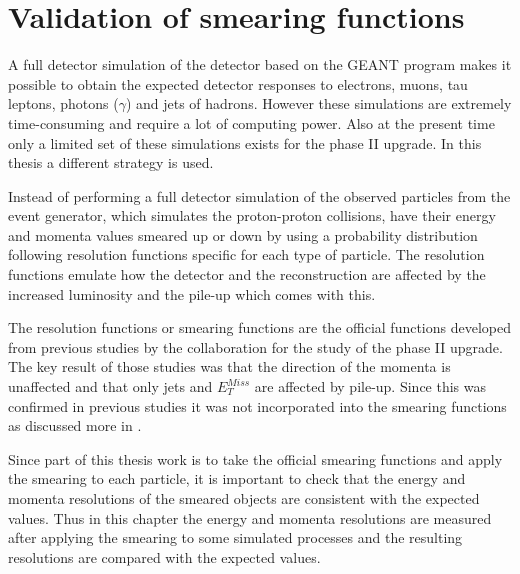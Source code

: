 \chapter{Validation of smearing functions}\label{cha:vali}
A full detector simulation of the \abbrATLAS detector based on the GEANT \citep{Geant4} program makes it possible to obtain the expected detector responses to electrons, muons, tau leptons, photons ($\gamma$) and jets of hadrons. However these simulations are extremely time-consuming and require a lot of computing power. Also at the present time only a limited set of these simulations exists for the \abbrATLAS phase II upgrade. In this thesis a different strategy is used. 

Instead of performing a full detector simulation of the observed particles from the event generator, which simulates the proton-proton collisions, have their energy and momenta values smeared up or down by using a probability distribution following resolution functions specific for each type of particle. The resolution functions emulate how the detector and the reconstruction are affected by the increased luminosity and the pile-up which comes with this. 

The resolution functions or smearing functions are the official functions developed from previous studies \citep{ATLAS:LOI2, ATL-PHYS-PUB-2013-004} by the \abbrATLAS collaboration for the study of the \abbrATLAS phase II upgrade. The key result of those studies was that the direction of the momenta is unaffected and that only jets and $E^{Miss}_T$ are affected by pile-up. Since this was confirmed in previous studies it was not incorporated into the smearing functions as discussed more in .

Since part of this thesis work is to take the official \abbrATLAS smearing functions and apply the smearing to each particle, it is important to check that the energy and momenta resolutions of the smeared objects are consistent with the expected values. Thus in this chapter the energy and momenta resolutions are measured after applying the smearing to some simulated processes and the resulting resolutions are compared with the expected values.

\newpage
